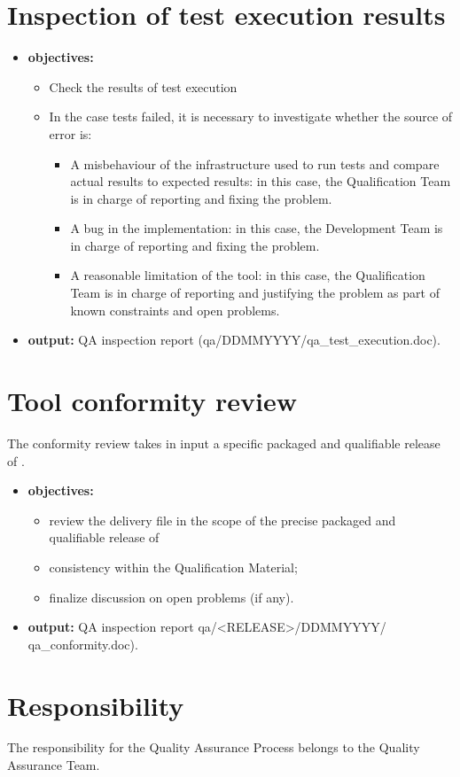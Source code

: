 \documentclass {report}
\begin{document}
\section{Inspection of test execution results}
\begin{itemize}
\item \textbf{objectives:}
\begin{itemize}
\item Check the results of test execution
\item In the case tests failed, it is necessary to investigate whether the source of error is:
\begin{itemize}
\item A misbehaviour of the infrastructure used to run tests and compare actual results to expected results: in this case, the Qualification Team is in charge
of reporting and fixing the problem.
\item A bug in the \xcov implementation: in this case, the Development
Team is in charge of reporting and fixing the problem.
\item A reasonable limitation of the tool: in this case, the Qualification
Team is in charge of reporting and justifying the problem as part of \xcov known constraints and open problems.
\end{itemize}
\end{itemize}
\item \textbf{output:} QA inspection report (qa/DDMMYYYY/qa\_test\_execution.doc).
\end{itemize}

\section{Tool conformity review}
The conformity review takes in input a specific packaged and qualifiable release of \xcov.
\begin{itemize}
\item \textbf{objectives:}
\begin{itemize}
\item review the delivery file in the scope of the precise packaged and qualifiable release of \xcov
\item consistency within the Qualification Material;
\item finalize discussion on open problems (if any).
\end{itemize}
\item \textbf{output:} QA inspection report qa/<RELEASE>/DDMMYYYY/ qa\_conformity.doc).
\end{itemize}


\section{Responsibility}
The responsibility for the Quality Assurance Process belongs to the Quality Assurance Team.
\end{document}
